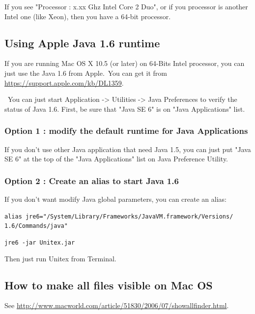 \bigskip
\noindent If you see "Processor : x.xx Ghz Intel Core 2 Duo", or if you
processor is another Intel one (like Xeon), then you have a 64-bit processor.

\subsection{Using Apple Java 1.6 runtime}
\bigskip{}
\noindent If you are running Mac OS X 10.5 (or later) on 64-Bits Intel processor, you can just use the Java 1.6 from Apple.\ You can get it from \url{https://support.apple.com/kb/DL1359}.

\noindent\ You can just start Application -> Utilities -> Java Preferences to verify the status of Java 1.6. First, be sure that "Java SE 6" is on "Java Applications" list.

\subsubsection{Option 1 : modify the default runtime for Java Applications}
\noindent If you don't use other Java application that need Java 1.5, you can just put "Java SE 6" at the top of the "Java Applications" list on Java Preference Utility.

\subsubsection{Option 2 : Create an alias to start Java 1.6}
\noindent If you don't want modify Java global parameters, you can create an
alias:

\bigskip
\noindent \verb+alias jre6="/System/Library/Frameworks/JavaVM.framework/Versions/+
\noindent \verb+1.6/Commands/java"+
   
\bigskip
\noindent \verb+jre6 -jar Unitex.jar+

\bigskip
\noindent Then just run Unitex from Terminal.





\subsection{How to make all files visible on Mac OS}
\noindent See
\url{http://www.macworld.com/article/51830/2006/07/showallfinder.html}.

